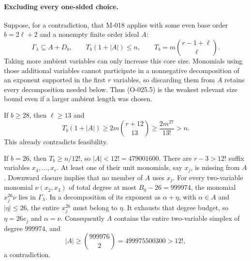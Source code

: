 \paragraph{Excluding every one-sided choice.}
Suppose, for a contradiction, that M-018 applies with
some even base order $b=2\ell+2$ and a nonempty finite
order ideal $A$:
\[
 \Gamma_\lambda\subseteq A+D_b,\qquad
             T_b(1+|A|)\leq n,\qquad
             T_b=m\binom{r-1+\ell}{\ell}.
                                                               \tag{O-025.5}
\]
Taking more ambient variables can only increase this
core size. Monomials using those additional variables
cannot participate in a nonnegative decomposition of
an exponent supported in the first $r$ variables, so
discarding them from $A$ retains every decomposition
needed below. Thus (O-025.5) is the weakest relevant
size bound even if a larger ambient length was chosen.

If $b\geq28$, then $\ell\geq13$ and
\[
 T_b(1+|A|)\geq2m\binom{r+12}{13}
                       \geq\frac{2m^{27}}{13!}>n.
                                                               \tag{O-025.6}
\]
This already contradicts feasibility.

If $b=26$, then $T_b\geq n/12!$, so
$|A|<12!=479001600$. There are $r-3>12!$ suffix
variables $x_4,\ldots,x_r$. At least one of their unit
monomials, say $x_j$, is missing from $A$.
Downward closure implies that no member of $A$ uses $x_j$.
For every two-variable monomial $\nu(x_2,x_3)$ of total
degree at most $B_0-26=999974$, the monomial
$x_j^{26}\nu$ lies in $\Gamma_\lambda$.
In a decomposition of its exponent as $\alpha+\eta$,
with $\alpha\in A$ and $|\eta|\leq26$,
the entire $x_j^{26}$ must belong to $\eta$.
It exhausts that degree budget, so $\eta=26e_j$ and
$\alpha=\nu$. Consequently $A$ contains the entire
two-variable simplex of degree $999974$, and
\[
                    |A|\geq\binom{999976}{2}
                        =499975500300>12!,
                                                               \tag{O-025.7}
\]
a contradiction.

